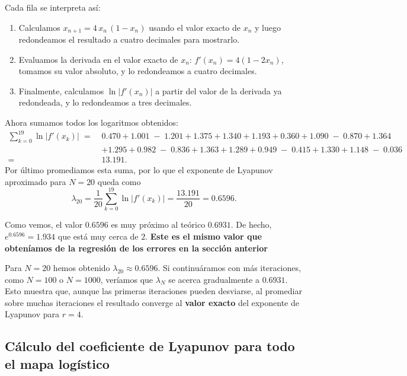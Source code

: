 \documentclass[
  10pt,
  a4paper,
  DIV=11,
  numbers=noendperiod,
  open=any]{scrreprt}
\providecommand{\tightlist}{%
  \setlength{\itemsep}{0pt}\setlength{\parskip}{0pt}}
\numberwithin{equation}{chapter}
\numberwithin{equation}{section}
\renewcommand{\[}{\begin{equation}}
\renewcommand{\]}{\end{equation}}
\begin{document}
Cada fila se interpreta así:

\begin{enumerate}
\def\labelenumi{\arabic{enumi}.}
\tightlist
\item
  Calculamos \(x_{n+1} = 4\,x_{n}\,(1 - x_{n})\) usando el valor exacto
  de \(x_{n}\) y luego redondeamos el resultado a cuatro decimales para
  mostrarlo.
\item
  Evaluamos la derivada en el valor exacto de \(x_{n}\):
  \(f'(x_{n}) = 4(1 - 2x_{n})\), tomamos su valor absoluto, y lo
  redondeamos a cuatro decimales.
\item
  Finalmente, calculamos \(\ln\lvert f'(x_{n})\rvert\) a partir del
  valor de la derivada ya redondeada, y lo redondeamos a tres decimales.
\end{enumerate}

Ahora sumamos todos los logaritmos obtenidos: \[
\begin{align}
\sum_{k=0}^{19} \ln\lvert f'(x_{k})\rvert \;=\;& 
0.470 + 1.001 \;-\; 1.201 + 1.375 + 1.340 + 1.193 + 0.360 + 1.090 \;-\; 0.870 + 1.364 \\
&+ 1.295 + 0.982 \;-\; 0.836 + 1.363 + 1.289 + 0.949 \;-\; 0.415 + 1.330 + 1.148 \;-\; 0.036 \\
=\;& 13.191.
\end{align}
\] Por último promediamos esta suma, por lo que el exponente de Lyapunov
aproximado para \(N = 20\) queda como \[
\lambda_{20} 
= \frac{1}{20} \sum_{k=0}^{19} \ln\lvert f'(x_{k})\rvert 
= \frac{13.191}{20} = 0.6596.
\]

Como vemos, el valor \(0.6596\) es muy próximo al teórico \(0.6931\). De
hecho, \(e^{0.6596}=1.934\) que está muy cerca de \(2\). \textbf{Este es
el mismo valor que obteníamos de la regresión de los errores en la
sección anterior}

Para \(N = 20\) hemos obtenido \(\lambda_{20} \approx 0.6596\). Si
continuáramos con más iteraciones, como \(N = 100\) o \(N = 1000\),
veríamos que \(\lambda_{N}\) se acerca gradualmente a \(0.6931\). Esto
muestra que, aunque las primeras iteraciones pueden desviarse, al
promediar sobre muchas iteraciones el resultado converge al
\textbf{valor exacto} del exponente de Lyapunov para \(r = 4\).

\subsection{Cálculo del coeficiente de Lyapunov para todo el mapa
logístico}\label{cuxe1lculo-del-coeficiente-de-lyapunov-para-todo-el-mapa-loguxedstico}
\end{document}
